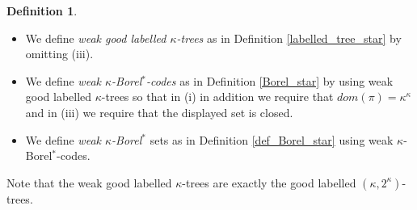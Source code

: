 \documentclass[12pt,a4paper]{amsart}
\theoremstyle{definition}
\newtheorem{defn}[thm]{Definition}
\theoremstyle{remark}
\def\borelstar{Borel\nobreak\hspace{1pt}$^*$}
\begin{document}
\begin{defn}
\mbox{}
\begin{itemize}
    \item     We define \emph{weak good labelled $\kappa$-trees} as in Definition \ref{labelled_tree_star} by omitting (iii).
    \item     We define  \emph{weak $\kappa$-\borelstar-codes} as in Definition \ref{Borel_star} by using weak good labelled $\kappa$-trees so that in (i) in addition we require that $dom(\pi)=\kappa^\kappa$ and in (iii) we require that the displayed set is closed.
    \item     We define \emph{weak $\kappa$-\borelstar} sets as in Definition \ref{def_Borel_star} using weak $\kappa$-\borelstar-codes.
\end{itemize}

Note that the weak good labelled $\kappa$-trees are exactly the good labelled $(\kappa,2^\kappa)$-trees.

\end{defn}
\end{document}

